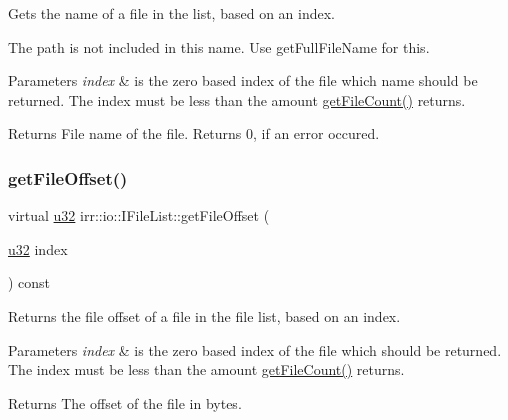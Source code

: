 Gets the name of a file in the list, based on an index. 

The path is not included in this name. Use get\+Full\+File\+Name for this. 
\begin{DoxyParams}{Parameters}
{\em index} & is the zero based index of the file which name should be returned. The index must be less than the amount \hyperlink{classirr_1_1io_1_1IFileList_a871861be76e18d58274c4580b1d103b9}{get\+File\+Count()} returns. \\
\hline
\end{DoxyParams}
\begin{DoxyReturn}{Returns}
File name of the file. Returns 0, if an error occured. 
\end{DoxyReturn}
\mbox{\label{classirr_1_1io_1_1IFileList_a97582a2cf5c05e7b8dcb702384ab76bd}} 
\subsubsection{\texorpdfstring{get\+File\+Offset()}{getFileOffset()}\hspace{0.1cm}{\footnotesize\ttfamily [1/2]}}
{\footnotesize\ttfamily virtual \hyperlink{namespaceirr_a0416a53257075833e7002efd0a18e804}{u32} irr\+::io\+::\+I\+File\+List\+::get\+File\+Offset (\begin{DoxyParamCaption}\item[{\hyperlink{namespaceirr_a0416a53257075833e7002efd0a18e804}{u32}}]{index }\end{DoxyParamCaption}) const\hspace{0.3cm}{\ttfamily [pure virtual]}}



Returns the file offset of a file in the file list, based on an index. 


\begin{DoxyParams}{Parameters}
{\em index} & is the zero based index of the file which should be returned. The index must be less than the amount \hyperlink{classirr_1_1io_1_1IFileList_a871861be76e18d58274c4580b1d103b9}{get\+File\+Count()} returns. \\
\hline
\end{DoxyParams}
\begin{DoxyReturn}{Returns}
The offset of the file in bytes. 
\end{DoxyReturn}
\mbox{\label{classirr_1_1io_1_1IFileList_a97582a2cf5c05e7b8dcb702384ab76bd}} 
